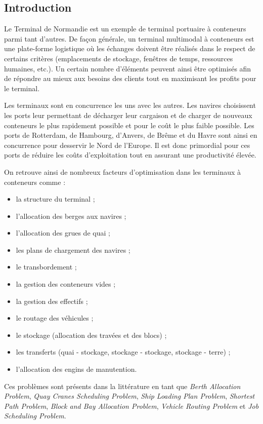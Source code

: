 
\subsection*{Introduction}

Le Terminal de Normandie est un exemple de terminal portuaire à conteneurs parmi tant d'autres. 
De façon générale, un terminal multimodal à conteneurs est une plate-forme logistique où les échanges doivent être réalisés dans le respect de certains critères (emplacements de stockage, fenêtres de temps, ressources humaines, etc.). 
Un certain nombre d'éléments peuvent ainsi être optimisés afin de répondre au mieux aux besoins des clients tout en maximisant les profits pour le terminal.

Les terminaux sont en concurrence les uns avec les autres. Les navires choisissent les ports leur permettant de décharger leur cargaison et de charger de nouveaux conteneurs le plus rapidement possible et pour le coût le plus faible possible. Les ports de Rotterdam, de Hambourg, d'Anvers, de Brême et du Havre sont ainsi en concurrence pour desservir le Nord de l'Europe. 
Il est donc primordial pour ces ports de réduire les coûts d'exploitation tout en assurant une productivité élevée.

On retrouve ainsi de nombreux facteurs d'optimisation dans les terminaux à conteneurs comme : 
\begin{itemize}
  \item la structure du terminal ;
  \item l'allocation des berges aux navires ;
  \item l'allocation des grues de quai ;
  \item les plans de chargement des navires ;
  \item le transbordement ;
  \item la gestion des conteneurs vides ;
  \item la gestion des effectifs ;
  \item le routage des véhicules ;
  \item le stockage (allocation des travées et des blocs) ;
  \item les transferts (quai - stockage, stockage - stockage, stockage - terre) ;
  \item l'allocation des engins de manutention.
\end{itemize}
Ces problèmes sont présents dans la littérature en tant que \textit{Berth Allocation Problem}, \textit{Quay Cranes Scheduling Problem}, \textit{Ship Loading Plan Problem}, \textit{Shortest Path Problem}, \textit{Block and Bay Allocation Problem}, \textit{Vehicle Routing Problem} et \textit{Job Scheduling Problem}. %

